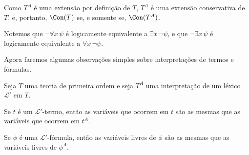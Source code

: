Como $T^A$ é uma extensão por definição de $T$, $T^A$ é uma extensão conservativa de $T$, e, portanto, $\Con(T)$ se, e somente se, $\Con(T^A)$.

Notemos que $\neg\forall x\,\psi$ é logicamente equivalente a $\exists x\,\neg\psi$, e que $\neg\exists x\,\psi$ é logicamente equivalente a $\forall x\,\neg\psi$.

Agora faremos algumas observações simples sobre interpretações de termos e fórmulas.

\begin{metalemma}
    Seja $T$ uma teoria de primeira ordem e seja $T^A$ uma interpretação de um léxico $\mathcal L'$ em $T$.

    Se $t$ é um $\mathcal L'$-termo, então as variáveis que ocorrem em $t$ são as mesmas que as variáveis que ocorrem em $t^A$.
    
    Se $\phi$ é uma $\mathcal L'$-fórmula, então as variáveis livres de $\phi$ são as mesmas que as variáveis livres de $\phi^A$.
\end{metalemma}
